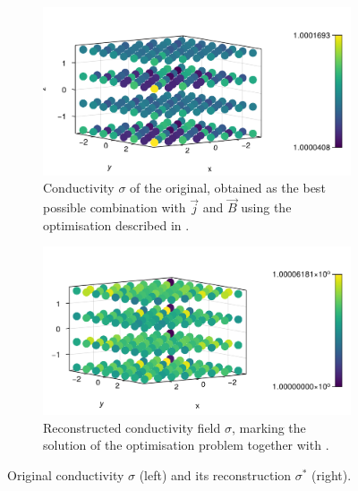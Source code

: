 \documentclass[10pt]{article}
\begin{document}
  \begin{figure}[H]
    \centering
    \begin{subfigure}[t]{0.48\textwidth}
      \centering
      \includegraphics[width=\textwidth]{../figures/cdpr-sigma.pdf}
      \caption{Conductivity $\sigma$ of the original, obtained as the best possible combination with $\vec{j}$ and $\vec{B}$ using the optimisation described in .}
      \label{fig:cdpr-sigma}
    \end{subfigure}
    \hfill
    \begin{subfigure}[t]{0.48\textwidth}
      \centering
      \includegraphics[width=\textwidth]{../figures/cdprr-sigma.pdf}
      \caption{Reconstructed conductivity field $\sigma$, marking the solution of the optimisation problem together with .}
      \label{fig:cdprr-sigma}
    \end{subfigure}
    \caption{Original conductivity $\sigma$ (left) and its reconstruction $\sigma^*$ (right).}
    \label{fig:sigma}
  \end{figure}
\end{document}
